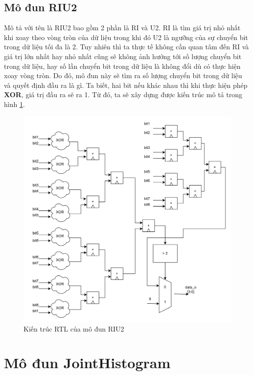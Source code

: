 \subsection{Mô đun RIU2}
Mô tả với tên là RIU2 bao gồm 2 phần là RI và U2. RI là tìm giá trị nhỏ nhất khi xoay theo vòng tròn của dữ liệu trong khi đó U2 là ngưỡng của sự chuyển bit trong dữ liệu tối đa là 2. Tuy nhiên thì ta thực tế không cần quan tâm đến RI và giá trị lớn nhất hay nhỏ nhất cũng sẽ không ảnh hưởng tới số lượng chuyển bit trong dữ liệu, hay số lần chuyển bit trong dữ liệu là không đổi dù có thực hiện xoay vòng tròn. Do đó, mô đun này sẽ tìm ra số lượng chuyển bit trong dữ liệu và quyết định đầu ra là gì. Ta biết, hai bit nếu khác nhau thì khi thực hiện phép \textbf{XOR}, giá trị đầu ra sẽ ra 1. Từ đó, ta sẽ xây dựng được kiến trúc mô tả trong hình \ref{fig:riu2RTL}.
\begin{figure}[!ht]
	\centering
	\includegraphics[width=1\linewidth]{figures/riu2RTL.png}
	\caption{Kiến trúc RTL của mô đun RIU2}
	\label{fig:riu2RTL}
\end{figure}

\section{Mô đun JointHistogram}

